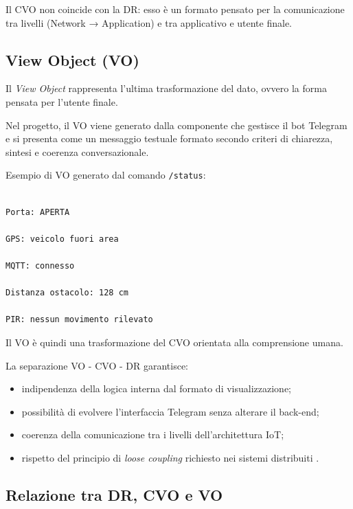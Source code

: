 Il CVO non coincide con la DR: esso è un formato pensato per la comunicazione tra livelli (Network → Application) e tra applicativo e utente finale.


\subsection{View Object (VO)}


Il \textit{View Object} rappresenta l’ultima trasformazione del dato, ovvero la forma pensata per l’utente finale.

Nel progetto, il VO viene generato dalla componente che gestisce il bot Telegram e si presenta come un messaggio testuale formato secondo criteri di chiarezza, sintesi e coerenza conversazionale.


Esempio di VO generato dal comando \texttt{/status}:


\begin{lstlisting}[caption={Esempio di View Object per l’interfaccia Telegram}]

Porta: APERTA

GPS: veicolo fuori area

MQTT: connesso

Distanza ostacolo: 128 cm

PIR: nessun movimento rilevato

\end{lstlisting}


Il VO è quindi una trasformazione del CVO orientata alla comprensione umana.

La separazione VO  - CVO -  DR garantisce:


\begin{itemize}

\item indipendenza della logica interna dal formato di visualizzazione;

\item possibilità di evolvere l’interfaccia Telegram senza alterare il back-end;

\item coerenza della comunicazione tra i livelli dell’architettura IoT;

\item rispetto del principio di \textit{loose coupling} richiesto nei sistemi distribuiti \cite{Gubbi2013}.

\end{itemize}


\subsection{Relazione tra DR, CVO e VO}


